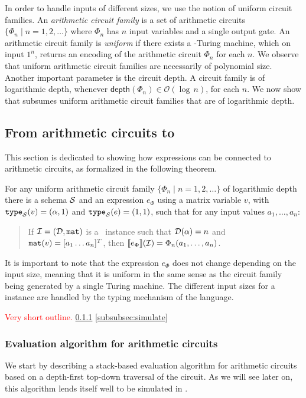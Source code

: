 In order to handle inputs of different sizes, we use the notion of uniform circuit families. An \textit{arithmetic circuit family} is a set of arithmetic circuits $\{\Phi_n\mid n=1,2,\ldots\}$ where $\Phi_n$ has $n$ input variables and a single output gate. An arithmetic circuit family is \textit{uniform} if there exists a \logspace-Turing machine,
which on input $1^n$, returns an encoding of the arithmetic circuit $\Phi_n$ for each $n$.
We observe that uniform arithmetic circuit families are necessarily of polynomial size. 
Another important parameter is the circuit depth. A circuit family is of logarithmic depth, whenever $\mathsf{depth}(\Phi_n)\in \mathcal{O}(\log\, n)$, for each $n$. We  now show that \langfor subsumes uniform arithmetic circuit families that are of logarithmic depth. 


\subsection{From arithmetic circuits to \langfor}\label{subsec:actoformatlang}
This section is dedicated to showing how \langfor expressions can be connected to arithmetic circuits, as formalized
in the following theorem.

\begin{theorem}
\label{th-circuits-ml}
For any uniform arithmetic circuit family $\{\Phi_n\mid n=1,2,\ldots\}$ of logarithmic depth there is a \langfor schema $\mathcal{S}$ and an expression $e_\Phi$ using a matrix variable $v$, with $\texttt{type}_{\mathcal{S}}(v)=(\alpha,1)$ and $\texttt{type}_{\mathcal{S}}(e) = (1,1)$, such that for any input values $a_1,\ldots ,a_n$: 
\begin{quote} If $\mathcal{I} = (\mathcal{D},\texttt{mat})$ is a \lang\ instance such that $\mathcal{D}(\alpha) = n$ and $\texttt{mat}(v) = [a_1 \ldots a_n]^T$,
 then $\llbracket e_\Phi \rrbracket(\mathcal{I}) = \Phi_n(a_1,\ldots ,a_n)$.
\end{quote}
\end{theorem}
It is important to note that the expression $e_\Phi$ does not change depending on the input size, meaning that it is uniform in the same sense as the circuit family being generated by a single Turing machine. The different input sizes for a \langfor instance are handled by the typing mechanism of the language. 

\textcolor{red}{Very short outline.}
\ref{subsubsec:eval}
\ref{subsubsec:simulate}
\subsubsection{Evaluation algorithm for arithmetic circuits}\label{subsubsec:eval}
We start by describing a stack-based evaluation algorithm for arithmetic circuits based on a depth-first top-down traversal of the circuit. As we will see later on, this algorithm lends itself well to be simulated in \langfor.


